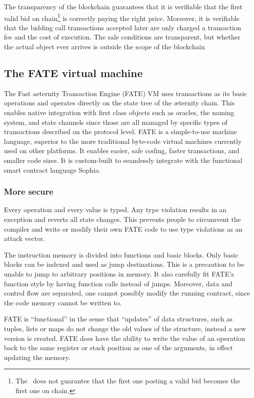 The transparency of the blockchain guarantees that it is verifiable
that the first valid bid on chain\footnote{The \blockchain\
  does not guarantee that the first one posting a valid bid becomes
  the first one on chain.} is correctly paying the right
price. Moreover, it is verifiable that the bidding call transactions accepted later are
only charged a transaction fee and the cost of execution.
The sale conditions are transparent, but whether the actual object ever
arrives is outside the scope of the blockchain

\subsection{The FATE virtual machine}
\label{sect:fate}

The Fast aeternity Transaction Engine (FATE) VM uses transactions as
its basic operations and operates directly on the state tree of the
æternity chain. This enables native integration with first class
objects such as oracles, the naming system, and state channels since
those are all managed by specific types of transactions described on
the protocol level. FATE is a simple-to-use machine language, superior
to the more traditional byte-code virtual machines currently used on
other platforms. It enables easier, safe coding, faster transactions,
and smaller code sizes. It is custom-built to seamlessly integrate
with the functional smart contract language Sophia.

\subsubsection{More secure}

Every operation and every value is typed. Any type violation results in
an exception and reverts all state changes. This prevents people to
circumvent the compiler and write or modify their own FATE code to use
type violations as an attack vector.

The instruction memory is divided into functions and basic
blocks. Only basic blocks can be indexed and used as jump
destinations. This is a precaution to be unable to jump to arbitrary
positions in memory. It also carefully fit FATE's function style by
having function calls instead of jumps. Moreover, data and control
flow are separated, one cannot possibly modify the running
contract, since the code memory cannot be written to.

FATE is “functional” in the sense that “updates” of data structures,
such as tuples, lists or maps do not change the old values of the
structure, instead a new version is created.  FATE does have the
ability to write the value of an operation back to the same register
or stack position as one of the arguments, in effect updating the
memory.

